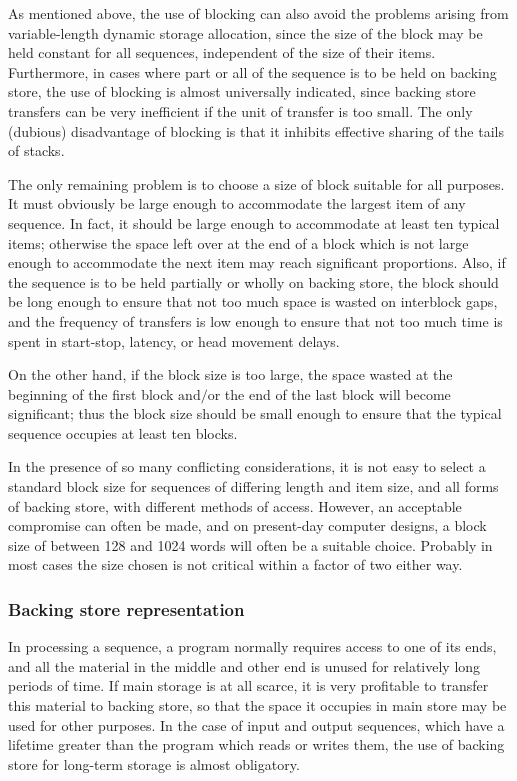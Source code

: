 As mentioned above, the use of blocking can also avoid the problems arising from variable-length dynamic storage allocation, since the size of the block may be held constant for all sequences, independent of the size of their items. Furthermore, in cases where part or all of the sequence is to be held on backing store, the use of blocking is almost universally indicated, since backing store transfers can be very inefficient if the unit of transfer is too small. The only (dubious) disadvantage of blocking is that it inhibits effective sharing of the tails of stacks.

The only remaining problem is to choose a size of block suitable for all purposes. It must obviously be large enough to accommodate the largest item of any sequence. In fact, it should be large enough to accommodate at least ten typical items; otherwise the space left over at the end of a block which is not large enough to accommodate the next item may reach significant proportions. Also, if the sequence is to be held partially or wholly on backing store, the block should be long enough to ensure that not too much space is wasted on interblock gaps, and the frequency of transfers is low enough to ensure that not too much time is spent in start-stop, latency, or head movement delays.

On the other hand, if the block size is too large, the space wasted at the beginning of the first block $\text{and}/\text{or}$ the end of the last block will become significant; thus the block size should be small enough to ensure that the typical sequence occupies at least ten blocks.

In the presence of so many conflicting considerations, it is not easy to select a standard block size for sequences of differing length and item size, and all forms of backing store, with different methods of access. However, an acceptable compromise can often be made, and on present-day computer designs, a block size of between 128 and 1024 words will often be a suitable choice. Probably in most cases the size chosen is not critical within a factor of two either way.

\subsubsection{Backing store representation}

In processing a sequence, a program normally requires access to one of its ends, and all the material in the middle and other end is unused for relatively long periods of time. If main storage is at all scarce, it is very profitable to transfer this material to backing store, so that the space it occupies in main store may be used for other purposes. In the case of input and output sequences, which have a lifetime greater than the program which reads or writes them, the use of backing store for long-term storage is almost obligatory.

